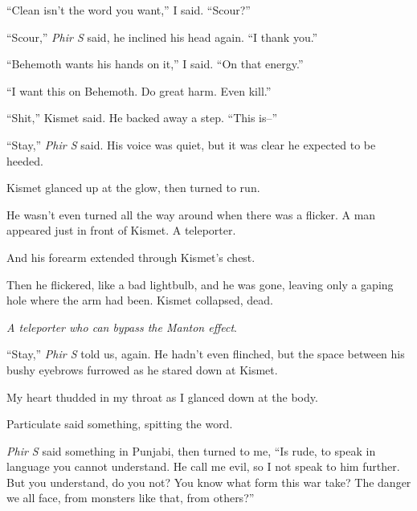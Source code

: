 ``Clean isn't the word you want,'' I said. ``Scour?''



``Scour,'' \emph{Phir S} said, he inclined his head again.  ``I thank you.''



``Behemoth wants his hands on it,'' I said.  ``On that energy.''



``I want this on Behemoth.  Do great harm.  Even kill.''



``Shit,'' Kismet said.  He backed away a step.  ``This is--''



``Stay,'' \emph{Phir S} said.  His voice was quiet, but it was clear he expected to be heeded.



Kismet glanced up at the glow, then turned to run.



He wasn't even turned all the way around when there was a flicker.  A man appeared just in front of Kismet.  A teleporter.



And his forearm extended through Kismet's chest.



Then he flickered, like a bad lightbulb, and he was gone, leaving only a gaping hole where the arm had been.  Kismet collapsed, dead.



\emph{A teleporter who can bypass the Manton effect}.



``Stay,'' \emph{Phir S} told us, again.  He hadn't even flinched, but the space between his bushy eyebrows furrowed as he stared down at Kismet.



My heart thudded in my throat as I glanced down at the body.



Particulate said something, spitting the word.



\emph{Phir S} said something in Punjabi, then turned to me, ``Is rude, to speak in language you cannot understand.  He call me evil, so I not speak to him further.  But you understand, do you not?  You know what form this war take?  The danger we all face, from monsters like that, from others?''




